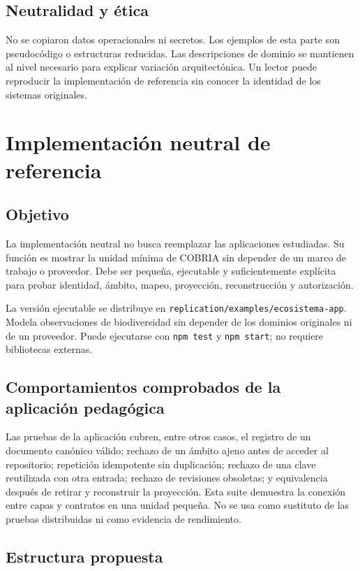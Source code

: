 \section{Neutralidad y ética}

No se copiaron datos operacionales ni secretos. Los ejemplos de esta parte son
pseudocódigo o estructuras reducidas. Las descripciones de dominio se mantienen al nivel
necesario para explicar variación arquitectónica. Un lector puede reproducir la
implementación de referencia sin conocer la identidad de los sistemas originales.

\chapter{Implementación neutral de referencia}

\section{Objetivo}

La implementación neutral no busca reemplazar las aplicaciones estudiadas. Su función es
mostrar la unidad mínima de COBRIA sin depender de un marco de trabajo o proveedor. Debe ser
pequeña, ejecutable y suficientemente explícita para probar identidad, ámbito, mapeo,
proyección, reconstrucción y autorización.

La versión ejecutable se distribuye en
\texttt{replication/examples/ecosistema-app}. Modela observaciones de biodiversidad sin
depender de los dominios originales ni de un proveedor. Puede ejecutarse con
\texttt{npm test} y \texttt{npm start}; no requiere bibliotecas externas.

\section{Comportamientos comprobados de la aplicación pedagógica}

Las pruebas de la aplicación cubren, entre otros casos, el registro de un documento canónico
válido; rechazo de un ámbito ajeno antes de acceder al repositorio; repetición
idempotente sin duplicación; rechazo de una clave reutilizada con otra entrada; rechazo
de revisiones obsoletas; y equivalencia después de retirar y reconstruir la proyección.
Esta suite demuestra la conexión entre capas y contratos en una unidad pequeña. No se
usa como sustituto de las pruebas distribuidas ni como evidencia de rendimiento.

\section{Estructura propuesta}

